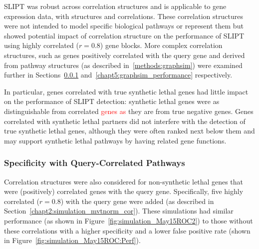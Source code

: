 \gls{SLIPT} was robust across correlation structures and is applicable to gene expression data, with  structures and correlations. These correlation structures were not intended to model specific biological pathways or represent them but showed potential impact of correlation structure on the performance of \gls{SLIPT} using highly correlated ($r = 0.8$) gene blocks. More complex correlation structures, such as genes positively correlated with the query gene and derived from pathway  structures (as described in~\ref{methods:graphsim}) were examined further in Sections~\ref{chapt2:simulation_mvtnorm_query_cor} and~\ref{chapt5:graphsim_performance} respectively.

In particular, genes correlated with true \gls{synthetic lethal} genes had little impact on the performance of \gls{SLIPT} detection: \gls{synthetic lethal} genes were as distinguishable from correlated \textcolor{red}{genes as} they are from true negative genes. Genes correlated with \gls{synthetic lethal} partners did not interfere with the detection of true \gls{synthetic lethal} genes, although they were often ranked next below them and may support \gls{synthetic lethal} pathways by having related gene functions.


\subsubsection{Specificity with Query-Correlated Pathways}  \label{chapt2:simulation_mvtnorm_query_cor}

Correlation structures were also considered for non-synthetic lethal genes that were (positively) correlated genes with the query gene. Specifically, five highly correlated ($r = 0.8$) with the query gene were added (as described in Section~\ref{chapt2:simulation_mvtnorm_cor}). These simulations had similar performance (as shown in Figure~\ref{fig:simulation_May15ROC2}) to those without these correlations with a higher specificity and a lower false positive rate (shown in Figure~\ref{fig:simulation_May15ROC:Perf}).


